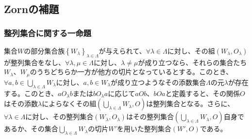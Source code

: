 \documentclass[dvipdfmx]{jsarticle}
\begin{document}
\subsection{Zornの補題}%
\subsubsection{整列集合に関する一命題}%
\begin{thm}\label{1.3.3.1}
集合$W$の部分集合族$\left\{ W_{\lambda} \right\}_{\lambda \in \varLambda }$が与えられて、$\forall\lambda \in \varLambda $に対し、その組$\left( W_{\lambda},O_{\lambda} \right)$が整列集合をなし、$\forall\lambda,\mu \in \varLambda $に対し、$\lambda \neq \mu$が成り立つなら、それらの集合たち$W_{\lambda}$、$W_{\mu}$のうちどちらか一方が他方の切片となっているとする。このとき、$\forall a,b \in \bigcup_{\lambda \in \varLambda } W_{\lambda}$に対し、$a,b \in W_{\lambda}$が成り立つようなその添数集合$\varLambda $の元$\lambda$が存在する。このとき、$aO_{\lambda}b$または$bO_{\lambda}a$に応じて$aOb$、$bOa$と定義すると、その関係$O$はその添数$\lambda$によらなくその組$\left( \bigcup_{\lambda \in \varLambda } W_{\lambda},O \right)$は整列集合となる。さらに、$\forall\lambda \in \varLambda $に対し、その整列集合$\left( W_{\lambda},O_{\lambda} \right)$はその整列集合$\left( \bigcup_{\lambda \in \varLambda } W_{\lambda},O \right)$自身であるか、その集合$\bigcup_{\lambda \in \varLambda } W_{\lambda}$の切片$W'$を用いた整列集合$\left( W',O \right)$である。
\end{thm}
\end{document}
